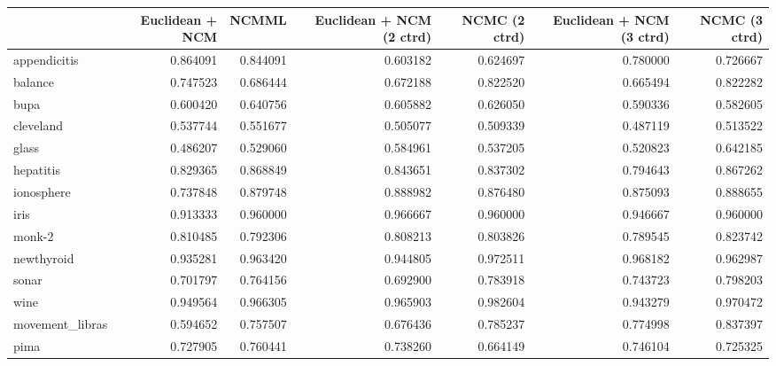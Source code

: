 \begin{tabular}{lrrrrrr}
\toprule
{} &  Euclidean + NCM &     NCMML &  Euclidean + NCM (2 ctrd) &  NCMC (2 ctrd) &  Euclidean + NCM (3 ctrd) &  NCMC (3 ctrd) \\
\midrule
appendicitis    &         0.864091 &  0.844091 &                  0.603182 &       0.624697 &                  0.780000 &       0.726667 \\
balance         &         0.747523 &  0.686444 &                  0.672188 &       0.822520 &                  0.665494 &       0.822282 \\
bupa            &         0.600420 &  0.640756 &                  0.605882 &       0.626050 &                  0.590336 &       0.582605 \\
cleveland       &         0.537744 &  0.551677 &                  0.505077 &       0.509339 &                  0.487119 &       0.513522 \\
glass           &         0.486207 &  0.529060 &                  0.584961 &       0.537205 &                  0.520823 &       0.642185 \\
hepatitis       &         0.829365 &  0.868849 &                  0.843651 &       0.837302 &                  0.794643 &       0.867262 \\
ionosphere      &         0.737848 &  0.879748 &                  0.888982 &       0.876480 &                  0.875093 &       0.888655 \\
iris            &         0.913333 &  0.960000 &                  0.966667 &       0.960000 &                  0.946667 &       0.960000 \\
monk-2          &         0.810485 &  0.792306 &                  0.808213 &       0.803826 &                  0.789545 &       0.823742 \\
newthyroid      &         0.935281 &  0.963420 &                  0.944805 &       0.972511 &                  0.968182 &       0.962987 \\
sonar           &         0.701797 &  0.764156 &                  0.692900 &       0.783918 &                  0.743723 &       0.798203 \\
wine            &         0.949564 &  0.966305 &                  0.965903 &       0.982604 &                  0.943279 &       0.970472 \\
movement\_libras &         0.594652 &  0.757507 &                  0.676436 &       0.785237 &                  0.774998 &       0.837397 \\
pima            &         0.727905 &  0.760441 &                  0.738260 &       0.664149 &                  0.746104 &       0.725325 \\

\end{tabular}

